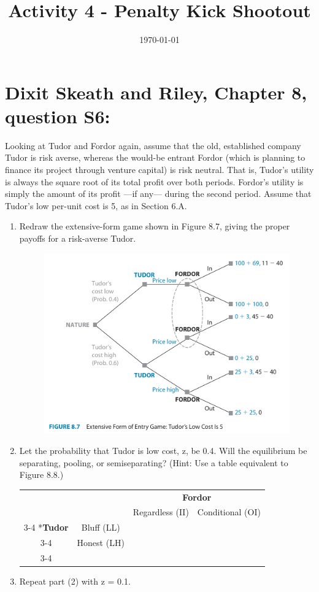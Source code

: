 \documentclass[12pt]{exam}
\title{Activity 4 - Penalty Kick Shootout}
\date{\today}
\begin{document}
\section*{Dixit Skeath and Riley, Chapter 8, question S6:}

Looking at Tudor and Fordor again, 
assume that the old, established company Tudor is risk averse,
whereas the would-be entrant Fordor
(which is planning to finance its project through venture capital)
is risk neutral. 
That is, Tudor’s utility is always the square root of its total profit
over both periods.
Fordor’s utility is simply the amount of its profit —if any—
during the second period. 
Assume that Tudor’s low per-unit cost is 5, as in Section 6.A.

\begin{enumerate}
  \item  Redraw the extensive-form game shown in Figure 8.7, 
  giving the proper payoffs for a risk-averse Tudor. 
  \begin{figure}[!h]
    \centering 
    \includegraphics[width=.6\textwidth]{Fig8.8.png}
  \end{figure}
  \item Let the probability that Tudor is low cost, z, be 0.4. 
  Will the equilibrium be separating, pooling, or semiseparating? 
  (Hint: Use a table equivalent to Figure 8.8.) 
  \begin{table}[!h]
    \centering
    \begin{tabular}{cc|c|c|}
      & \multicolumn{1}{c}{} & \multicolumn{2}{c}{\textbf{Fordor}}\\
      & \multicolumn{1}{c}{} & \multicolumn{1}{c}{Regardless (II)}  & \multicolumn{1}{c}{Conditional (OI)} \\\cline{3-4}
      \multirow{2}*{\textbf{Tudor}}  & Bluff (LL) & &  \\[10ex] \cline{3-4}
      & Honest (LH) &  &  \\[10ex] \cline{3-4}
    \end{tabular}
  \end{table}
  \item Repeat part (2) with z = 0.1.
\end{enumerate}
\end{document}
